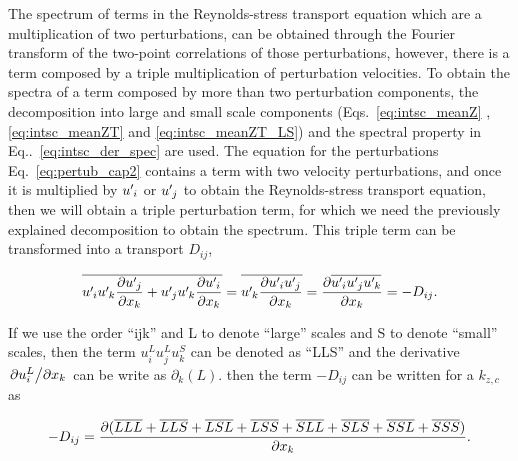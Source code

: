 The spectrum of terms in the Reynolds-stress transport equation which are a multiplication of two perturbations, can be obtained through the Fourier transform of the two-point correlations of those perturbations, however, there is a term composed by a triple multiplication of perturbation velocities.
To obtain the spectra of a term composed by more than two perturbation components, the decomposition into large and small scale components (Eqs.~\ref{eq:intsc_meanZ} , \ref{eq:intsc_meanZT} and \ref{eq:intsc_meanZT_LS}) and the spectral property in Eq..~\ref{eq:intsc_der_spec} are used.
The equation for the perturbations Eq.~\ref{eq:pertub_cap2} contains a term with two velocity perturbations, and once it is multiplied by $u^{\prime}\mkern-1.2mu_i$ or $u^{\prime}\mkern-1.2mu_j$ to obtain the Reynolds-stress transport equation, then we will obtain a triple perturbation term, for which we need the previously explained decomposition to obtain the spectrum. This triple term can be transformed into a transport $D_{ij}$,

\begin{equation}
    \overline{ u^{\prime}\mkern-1.2mu_i u^{\prime}\mkern-1.2mu_k \pdv{u^{\prime}\mkern-1.2mu_j}{x_k} + u^{\prime}\mkern-1.2mu_j u^{\prime}\mkern-1.2mu_k \pdv{u^{\prime}\mkern-1.2mu_i}{x_k} } = 
    \overline{ u^{\prime}\mkern-1.2mu_k \pdv{  u^{\prime}\mkern-1.2mu_i u^{\prime}\mkern-1.2mu_j }{x_k} } = 
    \pdv{ \overline{ u^{\prime}\mkern-1.2mu_i u^{\prime}\mkern-1.2mu_j u^{\prime}\mkern-1.2mu_k } }{x_k}  = 
    - D_{ij}. 
\end{equation}

If we use the order ``ijk'' and L to denote ``large'' scales and S to denote ``small'' scales, then the term $u_i^Lu_j^Lu_k^S$ can be denoted as ``LLS'' and the derivative $\pdv{u_i^L}/{x_k}$ can be write as $\partial_k(L)$.
then the term $-D_{ij}$ can be written for a $k_{z,c}$ as 

\begin{equation}
    \label{eq:Dij_LLL_decomp}
    - D_{ij} = \pdv{ (\overline{LLL} + \overline{LLS} + \overline{LSL} + \overline{LSS} + \overline{SLL} + \overline{SLS} + \overline{SSL} + \overline{SSS} ) }{x_k}.
\end{equation}

